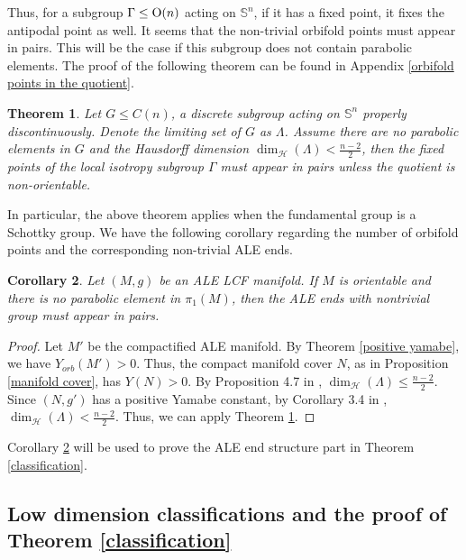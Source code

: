\documentclass[12pt]{amsart}
\newtheorem{theorem}{Theorem}[section]
\newtheorem{corollary}[theorem]{Corollary}
\theoremstyle{definition}
\begin{document}
Thus, for a subgroup $\Gamma\leq {\rm{O}}(n)$ acting on $\mathbb{S}^n$, if it has a fixed point, it fixes the antipodal point as well. It seems that the non-trivial orbifold points must appear in pairs. This will be the case if this subgroup does not contain parabolic elements. The proof of the following theorem can be found in Appendix \ref{orbifold points in the quotient}.
\begin{theorem}\label{orbifold points num}
        Let $G\leq C(n)$, a discrete subgroup acting on $\mathbb{S}^n$ properly discontinuously. Denote the limiting set of $G$ as $\Lambda$. Assume there are no parabolic elements in $G$ and the Hausdorff dimension $\operatorname{dim}_{\mathcal{H}}(\Lambda) < \frac{n-2}{2}$, then the fixed points of the local isotropy subgroup $\Gamma$ must appear in pairs unless the quotient is non-orientable.
\end{theorem}

In particular, the above theorem applies when the fundamental group is a Schottky group. We have the following corollary regarding the number of orbifold points and the corresponding non-trivial ALE ends.

\begin{corollary}\label{orientable ALE end} Let $(M,g)$ be an ALE LCF manifold. If $M$ is orientable and there is no parabolic element in $\pi_1(M)$, then the ALE ends with nontrivial group must appear in pairs.
\end{corollary}
\begin{proof}
Let $M'$ be the compactified ALE manifold. 
        By Theorem \ref{positive yamabe}, we have $Y_{orb}(M') > 0$. Thus, the compact manifold cover $N$, as in Proposition \ref{manifold cover}, has $Y(N)>0$. By Proposition 4.7 in \cite{SYconformal}, $\operatorname{dim}_{\mathcal{H}}(\Lambda)\leq \frac{n-2}{2}$. Since $(N,g')$ has a positive Yamabe constant, by Corollary 3.4 in \cite{Nayatani}, $\operatorname{dim}_{\mathcal{H}}(\Lambda)<\frac{n-2}{2}$. Thus, we can apply Theorem \ref{orbifold points num}.
\end{proof}
Corollary \ref{orientable ALE end} will be used to prove the ALE end structure part in Theorem \ref{classification}.


\subsection{Low dimension classifications and the proof of Theorem \ref{classification}} \label{classification proof}
\end{document}
